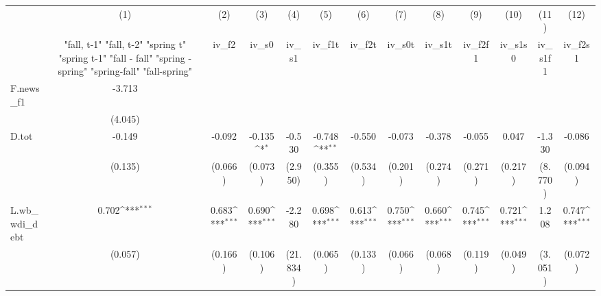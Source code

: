 {
\def\sym#1{\ifmmode^{#1}\else\(^{#1}\)\fi}
\begin{tabular}{l*{12}{c}}
\toprule
            &\multicolumn{1}{c}{(1)}&\multicolumn{1}{c}{(2)}&\multicolumn{1}{c}{(3)}&\multicolumn{1}{c}{(4)}&\multicolumn{1}{c}{(5)}&\multicolumn{1}{c}{(6)}&\multicolumn{1}{c}{(7)}&\multicolumn{1}{c}{(8)}&\multicolumn{1}{c}{(9)}&\multicolumn{1}{c}{(10)}&\multicolumn{1}{c}{(11)}&\multicolumn{1}{c}{(12)}\\
            &\multicolumn{1}{c}{  "fall, t-1" "fall, t-2" "spring t" "spring t-1"  "fall - fall" "spring - spring" "spring-fall" "fall-spring" }&\multicolumn{1}{c}{iv\_f2}&\multicolumn{1}{c}{iv\_s0}&\multicolumn{1}{c}{iv\_s1}&\multicolumn{1}{c}{iv\_f1t}&\multicolumn{1}{c}{iv\_f2t}&\multicolumn{1}{c}{iv\_s0t}&\multicolumn{1}{c}{iv\_s1t}&\multicolumn{1}{c}{iv\_f2f1}&\multicolumn{1}{c}{iv\_s1s0}&\multicolumn{1}{c}{iv\_s1f1}&\multicolumn{1}{c}{iv\_f2s1}\\
\midrule
F.news\_f1   &      -3.713         &                     &                     &                     &                     &                     &                     &                     &                     &                     &                     &                     \\
            &     (4.045)         &                     &                     &                     &                     &                     &                     &                     &                     &                     &                     &                     \\
\addlinespace
D.tot       &      -0.149         &      -0.092         &      -0.135\sym{*}  &      -0.530         &      -0.748\sym{**} &      -0.550         &      -0.073         &      -0.378         &      -0.055         &       0.047         &      -1.330         &      -0.086         \\
            &     (0.135)         &     (0.066)         &     (0.073)         &     (2.950)         &     (0.355)         &     (0.534)         &     (0.201)         &     (0.274)         &     (0.271)         &     (0.217)         &     (8.770)         &     (0.094)         \\
\addlinespace
L.wb\_wdi\_debt&       0.702\sym{***}&       0.683\sym{***}&       0.690\sym{***}&      -2.280         &       0.698\sym{***}&       0.613\sym{***}&       0.750\sym{***}&       0.660\sym{***}&       0.745\sym{***}&       0.721\sym{***}&       1.208         &       0.747\sym{***}\\
            &     (0.057)         &     (0.166)         &     (0.106)         &    (21.834)         &     (0.065)         &     (0.133)         &     (0.066)         &     (0.068)         &     (0.119)         &     (0.049)         &     (3.051)         &     (0.072)         \\

\end{tabular}}
